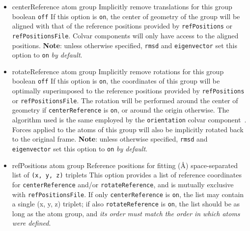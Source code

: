 \begin{itemize}

\item %
  \keydef
    {centerReference}{%
    atom group}{%
    Implicitly remove translations for this group}{%
    boolean}{%
    \texttt{off}}{%
    If this option is \texttt{on}, the center of geometry of the group will be aligned with that of the reference positions provided by  \texttt{refPositions} or \texttt{refPositionsFile}.
    Colvar components will only have access to the aligned positions.
\textbf{Note}: unless otherwise specified, \texttt{rmsd} and \texttt{eigenvector} set this option to \texttt{on} \emph{by default}.
}

\item %
  \keydef
    {rotateReference}{%
    atom group}{%
    Implicitly remove rotations for this group}{%
    boolean}{%
    \texttt{off}}{%
    If this option is \texttt{on}, the coordinates of this group will be optimally superimposed to the reference positions provided by  \texttt{refPositions} or \texttt{refPositionsFile}.
    The rotation will be performed around the center of geometry if \texttt{centerReference} is \texttt{on}, or around the origin otherwise.
    The algorithm used is the same employed by the \texttt{orientation} colvar component~\cite{Coutsias2004}.
    Forces applied to the atoms of this group will also be implicitly rotated back to the original frame.
    \textbf{Note}: unless otherwise specified, \texttt{rmsd} and \texttt{eigenvector} set this option to \texttt{on} \emph{by default}.
}

\item %
  \key
    {refPositions}{%
    atom group}{%
    Reference positions for fitting (\AA)}{%
    space-separated list of \texttt{(x, y, z)} triplets}{%
    \label{key:colvars:atom_group:refPositions}
    This option provides a list of reference coordinates for \texttt{centerReference} and/or \texttt{rotateReference}, and is mutually exclusive with \texttt{refPositionsFile}.
    If only \texttt{centerReference} is \texttt{on}, the list may contain a single (x, y, z) triplet; if also \texttt{rotateReference} is \texttt{on}, the list should be as long as the atom group, and \emph{its order must match the order in which atoms were defined}.
}


\end{itemize}
